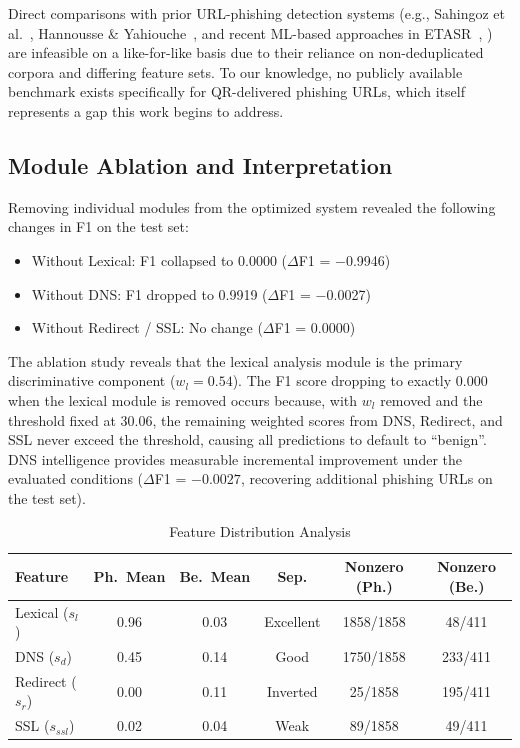 \documentclass[10pt,twocolumn,letterpaper]{article}
\begin{document}
Direct comparisons with prior URL-phishing detection systems (e.g., Sahingoz et al.~\cite{Sahingoz2019}, Hannousse \& Yahiouche~\cite{Hannousse2021}, and recent ML-based approaches in ETASR~\cite{AlSharafi2022}, \cite{AlZoubi2023}) are infeasible on a like-for-like basis due to their reliance on non-deduplicated corpora and differing feature sets. To our knowledge, no publicly available benchmark exists specifically for QR-delivered phishing URLs, which itself represents a gap this work begins to address.

\subsection{Module Ablation and Interpretation}

Removing individual modules from the optimized system revealed the following changes in F1 on the test set:

\begin{itemize}
    \item Without Lexical: F1 collapsed to 0.0000 ($\Delta$F1 = $-$0.9946)
    \item Without DNS: F1 dropped to 0.9919 ($\Delta$F1 = $-$0.0027)
    \item Without Redirect / SSL: No change ($\Delta$F1 = 0.0000)
\end{itemize}

The ablation study reveals that the lexical analysis module is the primary discriminative component ($w_l = 0.54$). The F1 score dropping to exactly 0.000 when the lexical module is removed occurs because, with $w_l$ removed and the threshold fixed at 30.06, the remaining weighted scores from DNS, Redirect, and SSL never exceed the threshold, causing all predictions to default to ``benign''. DNS intelligence provides measurable incremental improvement under the evaluated conditions ($\Delta$F1 = $-0.0027$, recovering additional phishing URLs on the test set). 

\begin{table}[t]
\centering
\caption{Feature Distribution Analysis}
\begin{tabular}{lccccc}
\toprule
\textbf{Feature} & \textbf{Ph.\ Mean} & \textbf{Be.\ Mean}
  & \textbf{Sep.} & \textbf{Nonzero (Ph.)} & \textbf{Nonzero (Be.)} \\
\midrule
Lexical ($s_l$)  & 0.96 & 0.03 & Excellent
  & 1858/1858 & 48/411 \\
DNS ($s_d$)      & 0.45 & 0.14 & Good
  & 1750/1858 & 233/411 \\
Redirect ($s_r$) & 0.00 & 0.11 & Inverted
  & 25/1858   & 195/411 \\
SSL ($s_{ssl}$)  & 0.02 & 0.04 & Weak
  & 89/1858   & 49/411 \\
\bottomrule
\end{tabular}
\end{table}
\end{document}
